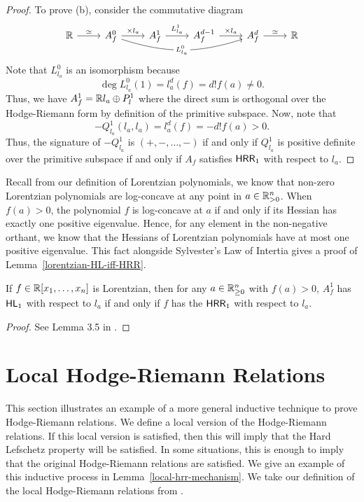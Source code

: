 \documentclass{puthesis-UG}
\begin{document}
\begin{proof}
To prove (b), consider the commutative diagram
\[\begin{tikzcd}
	{\mathbb{R}} & {A^0_f} & {A_f^1} & {A_f^{d-1}} & {A_f^d} & {\mathbb{R}}
	\arrow["{\times l_a}", from=1-2, to=1-3]
	\arrow["{L_{l_a}^1}", from=1-3, to=1-4]
	\arrow["{\times l_a}", from=1-4, to=1-5]
	\arrow["\simeq", from=1-1, to=1-2]
	\arrow["\simeq", from=1-5, to=1-6]
	\arrow["L_{l_a}^0"{description}, bend right= 18, from=1-2, to=1-5]
\end{tikzcd}\]
Note that $L_{l_a}^0$ is an isomorphism because 
\[
	\deg L_{l_a}^0 (1) = l_a^d (f)  = d! f(a) \neq 0.
\]
Thus, we have $A_f^1 = \mathbb{R} l_a \oplus P_l^1$ where the direct sum is orthogonal over the Hodge-Riemann form by definition of the primitive subspace. Now, note that 
\[
	-Q_{l_a}^1(l_a, l_a) = l_a^d (f) = -d! f(a) > 0. 
\]
Thus, the signature of $-Q_{l_a}^1$ is $(+, -, \ldots, -)$ if and only if $Q_{l_a}^1$ is positive definite over the primitive subspace if and only if $A_f$ satisfies $\mathsf{HRR}_1$ with respect to $l_a$. 
\end{proof}

Recall from our definition of Lorentzian polynomials, we know that non-zero Lorentzian polynomials are log-concave at any point in $a \in \mathbb{R}_{> 0}^n$. When $f(a) > 0$, the polynomial $f$ is log-concave at $a$ if and only if its Hessian has exactly one positive eigenvalue. Hence, for any element in the non-negative orthant, we know that the Hessians of Lorentzian polynomials have at most one positive eigenvalue. This fact alongside Sylvester's Law of Intertia gives a proof of Lemma~\ref{lorentzian-HL-iff-HRR}.

\begin{lem} \label{lorentzian-HL-iff-HRR}
	If $f \in \mathbb{R} [x_1, \ldots, x_n]$ is Lorentzian, then for any $a \in \mathbb{R}_{\geq 0}^n$ with $f(a) > 0$, $A_f^1$ has $\mathsf{HL}_1$ with respect to $l_a$ if and only if $f$ has the $\mathsf{HRR}_1$ with respect to $l_a$. 
\end{lem}

\begin{proof}
	See Lemma 3.5 in \cite{MNY}. 
\end{proof}

\section{Local Hodge-Riemann Relations}

This section illustrates an example of a more general inductive technique to prove Hodge-Riemann relations. We define a local version of the Hodge-Riemann relations. If this local version is satisfied, then this will imply that the Hard Lefschetz property will be satisfied. In some situations, this is enough to imply that the original Hodge-Riemann relations are satisfied. We give an example of this inductive process in Lemma~\ref{local-hrr-mechanism}. We take our definition of the local Hodge-Riemann relations from \cite{MNY}. 
\end{document}
